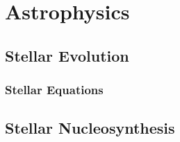 \chapter{Astrophysics}
\section{Stellar Evolution}
\subsection{Stellar Equations}

\section{Stellar Nucleosynthesis}
